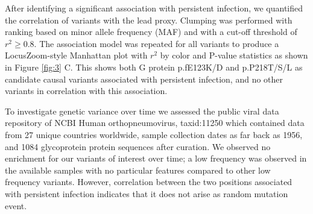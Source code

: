 \documentclass{article}
\begin{document}
After identifying a significant association with persistent infection,
we quantified the correlation of variants with the lead proxy.
Clumping was performed with ranking based on minor allele frequency (MAF) and with a cut-off threshold of $r^2 \ge 0.8$.
The association model was repeated for all variants to produce a LocusZoom-style Manhattan plot with $r^2$ by color and P-value statistics as shown in 
Figure \ref{fig:3} C.
This shows both G protein 
p.fE123K/D and 
p.P218T/S/L as candidate causal variants associated with persistent infection, and no other variants in correlation with this association. 


To investigate genetic variance over time
we assessed the public viral data repository of NCBI Human orthopneumovirus, taxid:11250 which contained data from 
27 unique countries worldwide, sample collection dates as far back as 1956, and 1084 glycoprotein protein sequences after curation.
We observed no enrichment for our variants of interest over time; 
a low frequency was observed in the available samples with no particular features compared to other low frequency variants. 
However, correlation between the two positions associated with persistent infection indicates that it does not arise as random mutation event.
\end{document}
